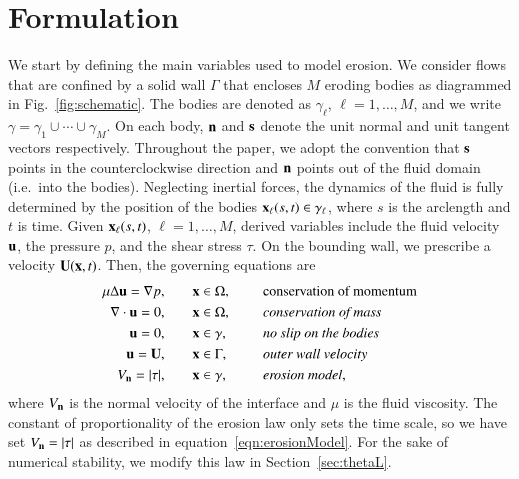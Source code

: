 \documentclass[preprint, 10pt]{elsarticle}
\begin{document}
\section{Formulation}
\label{s:formulation}
We start by defining the main variables used to model erosion.  We
consider flows that are confined by a solid wall $\Gamma$ that encloses
$M$ eroding bodies as diagrammed in Fig.~\ref{fig:schematic}.  The
bodies are denoted as $\gamma_\ell$, $\ell=1,\ldots,M$, and we write
$\gamma = \gamma_1 \cup \cdots \cup \gamma_M$.  On each body, $\nn$ and
$\ss$ denote the unit normal and unit tangent vectors respectively.
Throughout the paper, we adopt the convention that $\ss$ points in the
counterclockwise direction and $\nn$ points out of the fluid domain
(i.e.~into the bodies). Neglecting inertial forces, the dynamics of the
fluid is fully determined by the position of the bodies $\xx_\ell(s,t)
\in \gamma_\ell$, where $s$ is the arclength and $t$ is time.  Given
$\xx_\ell(s,t)$, $\ell=1,\ldots,M$, derived variables include the fluid
velocity $\uu$, the pressure $p$, and the shear stress $\tau$.   On the
bounding wall, we prescribe a velocity $\UU(\xx,t)$.  Then, the
governing equations are
\begin{equation}
\label{eqn:erosionModel}
\begin{split}
  \mu \Delta \uu = \grad p, &\hspace{20pt} \xx \in \Omega, \gap &&\mbox{conservation
of momentum}\\
\grad \cdot \uu = 0, &\hspace{20pt} \xx \in \Omega, \gap
&&\mbox{\em conservation of mass} \\
\uu = 0, &\hspace{20pt} \xx \in \gamma, \gap &&\mbox{\em no slip on the
bodies} \\
\uu = \UU, &\hspace{20pt} \xx \in \Gamma, \gap &&\mbox{\em outer wall
velocity} \\
\Vn = \abs{\tau}, &\hspace{20pt} \xx \in \gamma,
&&\mbox{\em erosion model},
\end{split}
\end{equation}
where $\Vn$ is the normal velocity of the interface and $\mu$ is the
fluid viscosity.   
The constant of proportionality of the erosion law only sets the time scale, so we have set
$\Vn = |\tau|$ as described in equation~\eqref{eqn:erosionModel}.  For
the sake of numerical stability, we modify this law in
Section~\ref{sec:thetaL}. 
\end{document}
